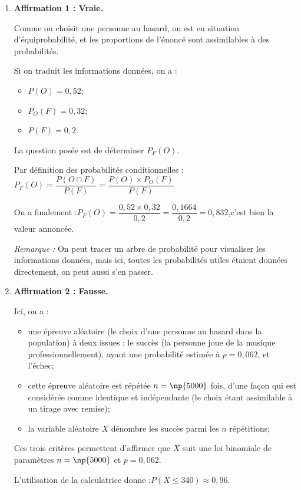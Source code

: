\begin{enumerate}
	\item \textbf{Affirmation 1 : Vraie.}

	Comme on choisit une personne au hasard, on est en situation d'équiprobabilité, et les proportions de l'énoncé sont assimilables à des probabilités.

	Si on traduit les informations données, on a :
	\begin{itemize}
		\item $P(O) = 0,52$;
		\item $P_O(F) = 0,32$;
		\item $P(F) = 0,2$.
	\end{itemize}

	La question posée est de déterminer $P_F(O)$.

	Par définition des probabilités conditionnelles :\quad $P_F(O) = \dfrac{P(O \cap F)}{P(F)} = \dfrac{P(O)\times P_O(F)}{P(F)}$

	On a finalement :\quad $P_F(O) = \dfrac{0,52 \times 0,32}{0,2} = \dfrac{0,1664}{0,2} = 0,832$,\quad c'est bien la valeur annoncée.

	\emph{Remarque :} On peut tracer un arbre de probabilité pour visualiser les informations données, mais ici, toutes les probabilités utiles étaient données directement, on peut aussi s'en passer.

	\item \textbf{Affirmation 2 : Fausse.}

	Ici, on a :
	\begin{itemize}
		\item une épreuve aléatoire (le choix d'une personne au hasard dans la population) à deux issues : le succès (la personne joue de la musique professionnellement), ayant une probabilité estimée à $p = 0,062$, et l'échec;
		\item cette épreuve aléatoire est répétée $n = \np{5000}$ fois, d'une façon qui est considérée comme identique et indépendante (le choix étant assimilable à un tirage avec remise);
		\item la variable aléatoire $X$ dénombre les succès parmi les $n$ répétitions;
	\end{itemize}

	Ces trois critères permettent d'affirmer que $X$ suit une loi binomiale de paramètres $n = \np{5000}$ et $p = 0,062$.

	L'utilisation de la calculatrice donne :\quad $P(X \leqslant 340) \approx 0,96$.


\end{enumerate}
